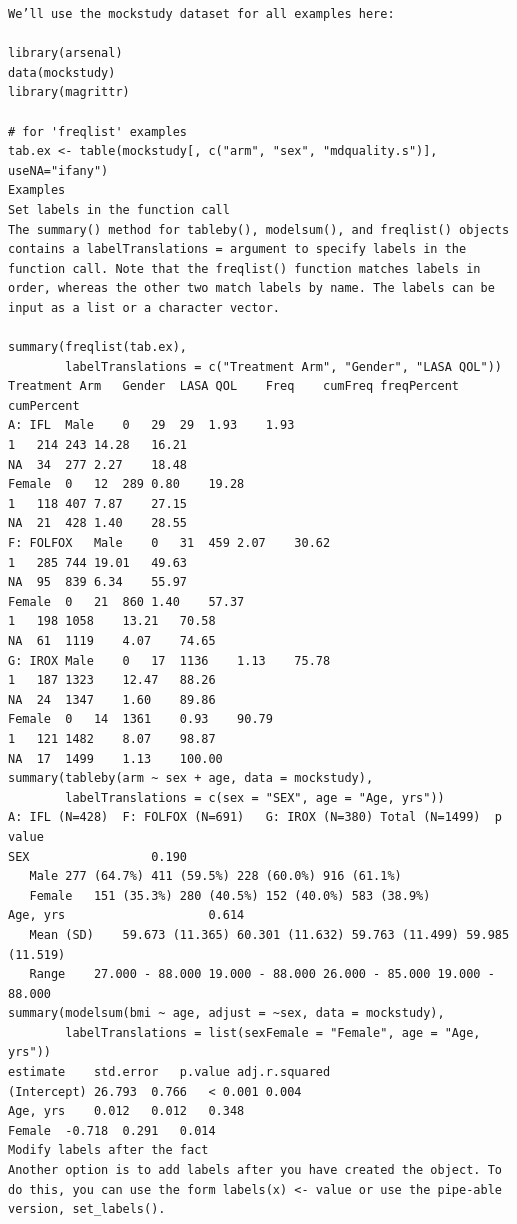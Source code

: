 \documentclass[
]{book}
\begin{document}
\begin{verbatim}
We’ll use the mockstudy dataset for all examples here:

library(arsenal)
data(mockstudy)
library(magrittr)

# for 'freqlist' examples
tab.ex <- table(mockstudy[, c("arm", "sex", "mdquality.s")], useNA="ifany")
Examples
Set labels in the function call
The summary() method for tableby(), modelsum(), and freqlist() objects contains a labelTranslations = argument to specify labels in the function call. Note that the freqlist() function matches labels in order, whereas the other two match labels by name. The labels can be input as a list or a character vector.

summary(freqlist(tab.ex),
        labelTranslations = c("Treatment Arm", "Gender", "LASA QOL"))
Treatment Arm   Gender  LASA QOL    Freq    cumFreq freqPercent cumPercent
A: IFL  Male    0   29  29  1.93    1.93
1   214 243 14.28   16.21
NA  34  277 2.27    18.48
Female  0   12  289 0.80    19.28
1   118 407 7.87    27.15
NA  21  428 1.40    28.55
F: FOLFOX   Male    0   31  459 2.07    30.62
1   285 744 19.01   49.63
NA  95  839 6.34    55.97
Female  0   21  860 1.40    57.37
1   198 1058    13.21   70.58
NA  61  1119    4.07    74.65
G: IROX Male    0   17  1136    1.13    75.78
1   187 1323    12.47   88.26
NA  24  1347    1.60    89.86
Female  0   14  1361    0.93    90.79
1   121 1482    8.07    98.87
NA  17  1499    1.13    100.00
summary(tableby(arm ~ sex + age, data = mockstudy),
        labelTranslations = c(sex = "SEX", age = "Age, yrs"))
A: IFL (N=428)  F: FOLFOX (N=691)   G: IROX (N=380) Total (N=1499)  p value
SEX                 0.190
   Male 277 (64.7%) 411 (59.5%) 228 (60.0%) 916 (61.1%) 
   Female   151 (35.3%) 280 (40.5%) 152 (40.0%) 583 (38.9%) 
Age, yrs                    0.614
   Mean (SD)    59.673 (11.365) 60.301 (11.632) 59.763 (11.499) 59.985 (11.519) 
   Range    27.000 - 88.000 19.000 - 88.000 26.000 - 85.000 19.000 - 88.000 
summary(modelsum(bmi ~ age, adjust = ~sex, data = mockstudy),
        labelTranslations = list(sexFemale = "Female", age = "Age, yrs"))
estimate    std.error   p.value adj.r.squared
(Intercept) 26.793  0.766   < 0.001 0.004
Age, yrs    0.012   0.012   0.348   
Female  -0.718  0.291   0.014   
Modify labels after the fact
Another option is to add labels after you have created the object. To do this, you can use the form labels(x) <- value or use the pipe-able version, set_labels().


\end{verbatim}
\end{document}

